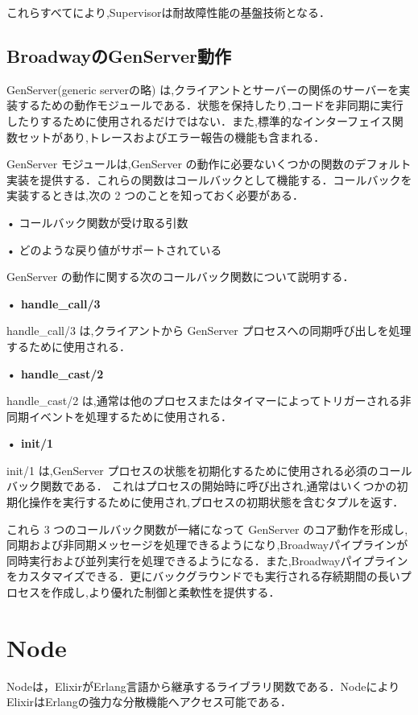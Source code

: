 \documentclass[a4paper]{jreport}	%
\begin{document}
これらすべてにより,Supervisorは耐故障性能の基盤技術となる．

\subsection{BroadwayのGenServer動作}
GenServer(generic serverの略) は,クライアントとサーバーの関係のサーバーを実装するための動作モジュールである．状態を保持したり,コードを非同期に実行したりするために使用されるだけではない．また,標準的なインターフェイス関数セットがあり,トレースおよびエラー報告の機能も含まれる\cite{M}．

GenServer モジュールは,GenServer の動作に必要ないくつかの関数のデフォルト実装を提供する．これらの関数はコールバックとして機能する．コールバックを実装するときは,次の 2 つのことを知っておく必要がある．

• コールバック関数が受け取る引数

• どのような戻り値がサポートされている

GenServer の動作に関する次のコールバック関数について説明する．

\textbf{• handle\_call/3}

handle\_call/3 は,クライアントから GenServer プロセスへの同期呼び出しを処理するために使用される．

\textbf{• handle\_cast/2}

handle\_cast/2 は,通常は他のプロセスまたはタイマーによってトリガーされる非同期イベントを処理するために使用される．

\textbf{• init/1}

init/1 は,GenServer プロセスの状態を初期化するために使用される必須のコールバック関数である． これはプロセスの開始時に呼び出され,通常はいくつかの初期化操作を実行するために使用され,プロセスの初期状態を含むタプルを返す．


これら 3 つのコールバック関数が一緒になって GenServer のコア動作を形成し,同期および非同期メッセージを処理できるようになり,Broadwayパイプラインが同時実行および並列実行を処理できるようになる．また,Broadwayパイプラインをカスタマイズできる．更にバックグラウンドでも実行される存続期間の長いプロセスを作成し,より優れた制御と柔軟性を提供する．


\section{Node}
Nodeは，ElixirがErlang言語から継承するライブラリ関数である\cite{H}．NodeによりElixirはErlangの強力な分散機能へアクセス可能である\cite{J}．
\end{document}
